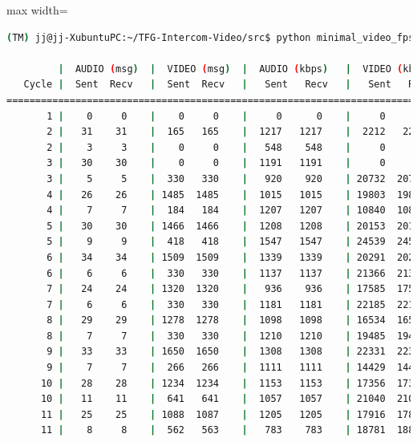\begin{adjustbox}{max width=\textwidth}
\begin{lstlisting}[language=bash,basicstyle=\ttfamily\scriptsize]
(TM) jj@jj-XubuntuPC:~/TFG-Intercom-Video/src$ python minimal_video_fps.py --show_video --show_stats --camera_index 1 -z 12

         |  AUDIO (msg)  |  VIDEO (msg)  |  AUDIO (kbps)   |  VIDEO (kbps)   |     CPU (%) 
   Cycle |  Sent  Recv   |  Sent  Recv   |   Sent   Recv   |   Sent   Recv   | Program System
================================================================================================
       1 |    0     0    |    0     0    |     0      0    |     0      0    |   0    100       
       2 |   31    31    |  165   165    |  1217   1217    |  2212   2212    |  38     68       
       2 |    3     3    |    0     0    |   548    548    |     0      0    |  33     67       
       3 |   30    30    |    0     0    |  1191   1191    |     0      0    |  47     72       
       3 |    5     5    |  330   330    |   920    920    | 20732  20732    |  22     71       
       4 |   26    26    | 1485  1485    |  1015   1015    | 19803  19803    |  28     67       
       4 |    7     7    |  184   184    |  1207   1207    | 10840  10840    |  42     67       
       5 |   30    30    | 1466  1466    |  1208   1208    | 20153  20153    |  46     64       
       5 |    9     9    |  418   418    |  1547   1547    | 24539  24539    |  52     66       
       6 |   34    34    | 1509  1509    |  1339   1339    | 20291  20291    |  39     71       
       6 |    6     6    |  330   330    |  1137   1137    | 21366  21366    |  28     69       
       7 |   24    24    | 1320  1320    |   936    936    | 17585  17585    |  44     67       
       7 |    6     6    |  330   330    |  1181   1181    | 22185  22185    |  42     68       
       8 |   29    29    | 1278  1278    |  1098   1098    | 16534  16534    |  45     66       
       8 |    7     7    |  330   330    |  1210   1210    | 19485  19485    |  42     66       
       9 |   33    33    | 1650  1650    |  1308   1308    | 22331  22331    |  36     72       
       9 |    7     7    |  266   266    |  1111   1111    | 14429  14429    |  19     72       
      10 |   28    28    | 1234  1234    |  1153   1153    | 17356  17356    |  44     72       
      10 |   11    11    |  641   641    |  1057   1057    | 21040  21040    |  41     73       
      11 |   25    25    | 1088  1087    |  1205   1205    | 17916  17899    |  26     74       
      11 |    8     8    |  562   563    |   783    783    | 18781  18815    |  35     73       

\end{lstlisting}
\end{adjustbox}
